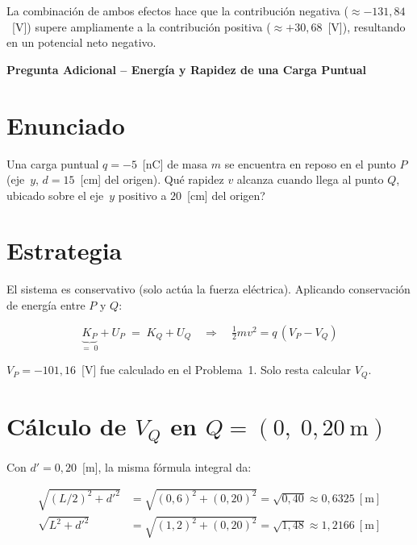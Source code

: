 \documentclass[12pt,letterpaper]{article}
\begin{document}
La combinaci\'on de ambos efectos hace que la contribuci\'on negativa
($\approx -131{,}84$~[V]) supere ampliamente a la contribuci\'on positiva
($\approx +30{,}68$~[V]), resultando en un potencial neto negativo.

\newpage

{\centering\Large\textbf{Pregunta Adicional -- Energ\'ia y Rapidez de una Carga Puntual}\par}
\vspace{0.4cm}

\section*{Enunciado}

Una carga puntual $q = -5$~[nC] de masa $m$ se encuentra en reposo en el punto $P$
(eje~$y$, $d = 15$~[cm] del origen). \textquestiondown Qu\'e rapidez $v$ alcanza
cuando llega al punto $Q$, ubicado sobre el eje~$y$ positivo a $20$~[cm] del origen?

\section*{Estrategia}

El sistema es conservativo (solo act\'ua la fuerza el\'ectrica).
Aplicando conservaci\'on de energ\'ia entre $P$ y $Q$:

\[
    \underbrace{K_P}_{=\;0} + U_P \;=\; K_Q + U_Q
    \quad\Longrightarrow\quad
    \tfrac{1}{2}mv^2 = q\,(V_P - V_Q)
\]

$V_P = -101{,}16$~[V] fue calculado en el Problema~1.
Solo resta calcular $V_Q$.

\section*{C\'alculo de $V_Q$ en $Q=(0,\;0{,}20\ \text{m})$}

Con $d' = 0{,}20$~[m], la misma f\'ormula integral da:

\begin{align*}
    \sqrt{(L/2)^2+d'^2}
        &= \sqrt{(0{,}6)^2+(0{,}20)^2}
         = \sqrt{0{,}40}
         \approx 0{,}6325\ [\text{m}]\\[4pt]
    \sqrt{L^2+d'^2}
        &= \sqrt{(1{,}2)^2+(0{,}20)^2}
         = \sqrt{1{,}48}
         \approx 1{,}2166\ [\text{m}]
\end{align*}
\end{document}
